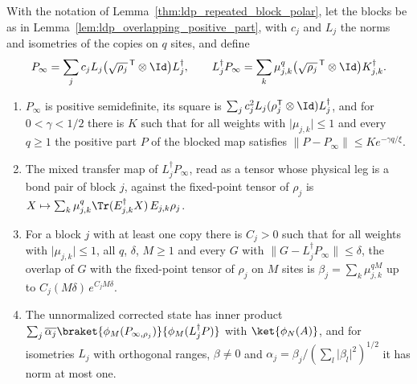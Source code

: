 \begin{lemma}
    \label{lem:ldp_repeated_overlapping_overlaps}
    \leanok
    With the notation of Lemma~\ref{thm:ldp_repeated_block_polar}, let the blocks be
    as in Lemma~\ref{lem:ldp_overlapping_positive_part}, with $c_j$ and $L_j$ the norms
    and isometries of the copies on $q$ sites, and define
    \begin{align*}
        P_\infty=\sum_jc_jL_j\bigl(\sqrt{\rho_j}^{\,\mathsf T}\otimes\Id\bigr)L_j^\dagger,
        \qquad
        L_j^\dagger P_\infty=\sum_k\mu_{j,k}^q\bigl(\sqrt{\rho_j}^{\,\mathsf T}\otimes\Id\bigr)
        K_{j,k}^\dagger.
    \end{align*}
    \begin{enumerate}
        \item $P_\infty$ is positive semidefinite, its square is
              $\sum_jc_j^2L_j(\rho_j^{\mathsf T}\otimes\Id)L_j^\dagger$, and for
              $0<\gamma<1/2$ there is $K$ such that for all weights with
              $\lvert\mu_{j,k}\rvert\leq1$ and every $q\geq1$ the positive part $P$ of the
              blocked map satisfies $\lVert P-P_\infty\rVert\leq Ke^{-\gamma q/\xi}$.
        \item The mixed transfer map of $L_j^\dagger P_\infty$, read as a tensor whose
              physical leg is a bond pair of block $j$, against the fixed-point tensor
              of $\rho_j$ is $X\mapsto\sum_k\mu_{j,k}^q\Tr(E_{j,k}^\dagger X)\,E_{j,k}\rho_j$.
        \item For a block $j$ with at least one copy there is $C_j>0$ such that for all
              weights with $\lvert\mu_{j,k}\rvert\leq1$, all $q$, $\delta$, $M\geq1$ and
              every $G$ with $\lVert G-L_j^\dagger P_\infty\rVert\leq\delta$, the overlap
              of $G$ with the fixed-point tensor of $\rho_j$ on $M$ sites is
              $\beta_j=\sum_k\mu_{j,k}^{qM}$ up to $C_j(M\delta)\,e^{C_jM\delta}$.
        \item The unnormalized corrected state has inner product
              $\sum_j\overline{\alpha_j}\braket{\phi_M(P_{\infty,\rho_j})}
                  {\phi_M(L_j^\dagger P)}$ with $\ket{\phi_N(A)}$, and for isometries
              $L_j$ with orthogonal ranges, $\beta\neq0$ and
              $\alpha_j=\beta_j/(\sum_l\lvert\beta_l\rvert^2)^{1/2}$ it has norm at most one.
    \end{enumerate}
\end{lemma}
